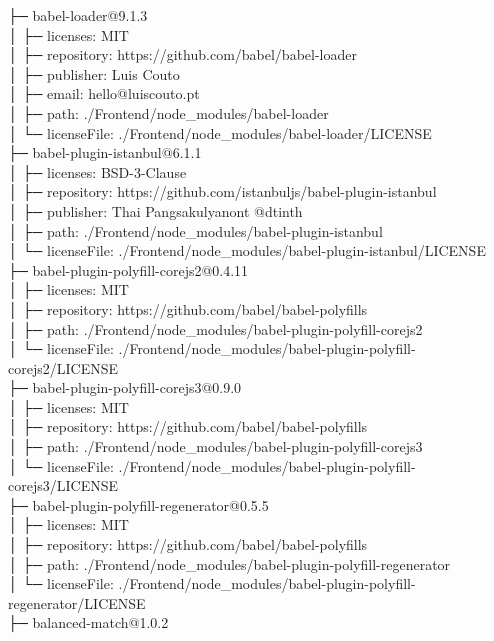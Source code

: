 ├─ babel-loader@9.1.3\\
│  ├─ licenses: MIT\\
│  ├─ repository: https://github.com/babel/babel-loader\\
│  ├─ publisher: Luis Couto\\
│  ├─ email: hello@luiscouto.pt\\
│  ├─ path: ./Frontend/node\_modules/babel-loader\\
│  └─ licenseFile: ./Frontend/node\_modules/babel-loader/LICENSE\\
├─ babel-plugin-istanbul@6.1.1\\
│  ├─ licenses: BSD-3-Clause\\
│  ├─ repository: https://github.com/istanbuljs/babel-plugin-istanbul\\
│  ├─ publisher: Thai Pangsakulyanont @dtinth\\
│  ├─ path: ./Frontend/node\_modules/babel-plugin-istanbul\\
│  └─ licenseFile: ./Frontend/node\_modules/babel-plugin-istanbul/LICENSE\\
├─ babel-plugin-polyfill-corejs2@0.4.11\\
│  ├─ licenses: MIT\\
│  ├─ repository: https://github.com/babel/babel-polyfills\\
│  ├─ path: ./Frontend/node\_modules/babel-plugin-polyfill-corejs2\\
│  └─ licenseFile: ./Frontend/node\_modules/babel-plugin-polyfill-corejs2/LICENSE\\
├─ babel-plugin-polyfill-corejs3@0.9.0\\
│  ├─ licenses: MIT\\
│  ├─ repository: https://github.com/babel/babel-polyfills\\
│  ├─ path: ./Frontend/node\_modules/babel-plugin-polyfill-corejs3\\
│  └─ licenseFile: ./Frontend/node\_modules/babel-plugin-polyfill-corejs3/LICENSE\\
├─ babel-plugin-polyfill-regenerator@0.5.5\\
│  ├─ licenses: MIT\\
│  ├─ repository: https://github.com/babel/babel-polyfills\\
│  ├─ path: ./Frontend/node\_modules/babel-plugin-polyfill-regenerator\\
│  └─ licenseFile: ./Frontend/node\_modules/babel-plugin-polyfill-regenerator/LICENSE\\
├─ balanced-match@1.0.2\\
